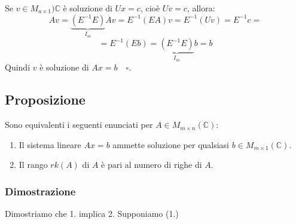 \documentclass[a4paper]{article}
\theoremstyle{break}
\theoremstyle{break}
\theoremstyle{break}
\theoremstyle{break}
\begin{document}
Se \( v \in M_{a \times  1})\mathbb{C} \) è soluzione di \( Ux = c \), cioè \( Uv = c \),
allora:
\[
  Av = \underbrace{(E^{-1}E)}_{I_m}Av = E^{-1}(EA)v = E^{-1}(Uv) = E^{-1}c =
\] 
\[
  = E^{-1}(Eb) = \underbrace{(E^{-1}E)}_{I_m}b = b
\] 
Quindi \( v \) è soluzione di \( Ax = b \quad \square \). 

\subsection{Proposizione}
Sono equivalenti i seguenti enunciati per \( A \in  M_{m \times n}(\mathbb{C}) \):
\begin{enumerate}
  \item Il sistema lineare \( Ax = b \) ammette soluzione per qualsiasi \( b \in M_{m \times 1}(\mathbb{C}) \).
  \item Il rango \( rk(A) \) di \( A \) è pari al numero di righe di \( A \).
\end{enumerate}

\subsubsection{Dimostrazione}
Dimostriamo che 1. implica 2. Supponiamo (1.)
\end{document}
